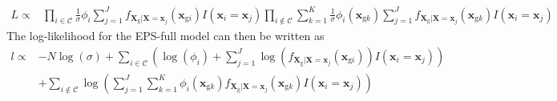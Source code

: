 \documentclass[10pt,a4paper]{article}
\def\bx{\mathbf{x}}
\def\bX{\mathbf{X}}
\def\bxgi{\mathbf{x}_{\text{g}i}}
\def\bxgk{\mathbf{x}_{\text{g}k}}
\def\bXg{\mathbf{X}_{\text{g}}}
\begin{document}
\begin{align*}
L \propto & \prod_{i \in \mathcal{C}} \frac{1}{\sigma} \phi_i \sum_{j=1}^J f_{\bXg|\bX = \bx_j}(\bxgi)I(\bx_i=\bx_j) \prod_{i \not \in \mathcal{C}} \sum_{k=1}^K \frac{1}{\sigma} \phi_i(\bxgk) \sum_{j=1}^J f_{\bXg|\bX = \bx_j}(\bxgk)I(\bx_i=\bx_j)
\end{align*}
The log-likelihood for the EPS-full model can then be written as
\begin{align*}
l \propto & - N\log(\sigma) + \sum_{i \in \mathcal{C}} \left( \log\left( \phi_i \right) + \sum_{j=1}^J \log\left( f_{\bXg|\bX = \bx_j}(\bxgi)\right) I(\bx_i = \bx_j) \right) \\ &+ \sum_{i \not \in \mathcal{C}} \log\left( \sum_{j=1}^J \sum_{k=1}^{K} \phi_i(\bxgk) f_{\bXg|\bX = \bx_j}(\bxgk)  I(\bx_i = \bx_j) \right)
\end{align*}
\end{document}
